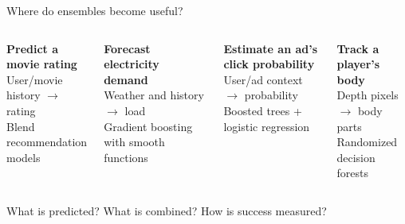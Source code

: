 \begin{frame}[t]{Where do ensembles become useful?}
\vspace{.13cm}
\begin{columns}[T,onlytextwidth]
\begin{definitionbox}\textbf{Predict a movie rating}\\
User/movie history $\longrightarrow$ rating\\[3pt]
Blend recommendation models
\end{definitionbox}
\vspace{.13cm}
\begin{definitionbox}\textbf{Forecast electricity demand}\\
Weather and history $\longrightarrow$ load\\[3pt]
Gradient boosting with smooth functions
\end{definitionbox}
\begin{definitionbox}\textbf{Estimate an ad's click probability}\\
User/ad context $\longrightarrow$ probability\\[3pt]
Boosted trees + logistic regression
\end{definitionbox}
\vspace{.13cm}
\begin{definitionbox}\textbf{Track a player's body}\\
Depth pixels $\longrightarrow$ body parts\\[3pt]
Randomized decision forests
\end{definitionbox}
\end{columns}
\vfill\begin{takeaway}What is predicted? What is combined? How is success measured?\end{takeaway}
\end{frame}
